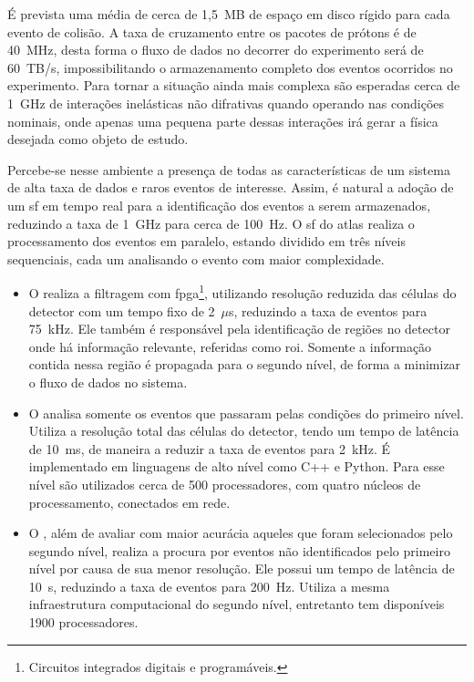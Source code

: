 É prevista uma média de cerca de 1,5~MB de espaço em disco rígido para cada evento de 
colisão. A taxa de cruzamento entre os pacotes de prótons é de 40~MHz, 
desta forma o fluxo de dados no decorrer do experimento será de 60~TB/s, impossibilitando o
armazenamento completo dos eventos ocorridos no experimento. Para tornar a
situação ainda mais complexa são esperadas cerca de 1~GHz de interações
inelásticas não difrativas quando operando nas condições nominais, onde apenas
uma pequena parte dessas interações irá gerar a física desejada como objeto de
estudo.

Percebe-se nesse ambiente a presença de todas as características de um sistema de 
alta taxa de dados e raros eventos de interesse.
Assim, é natural a adoção de um \glsdesc{sf} em tempo real para a
identificação dos eventos a serem armazenados, reduzindo a taxa de 1~GHz
para cerca de 100~Hz. O \glsdesc{sf} do \gls{atlas} realiza o processamento dos 
eventos em paralelo, estando dividido em três níveis sequenciais, cada um 
analisando o evento com maior complexidade.

\begin{itemize}
\item O  realiza a filtragem com
\gls{fpga}\footnote{Circuitos integrados digitais e programáveis.}, 
utilizando resolução reduzida das células do detector
com um tempo fixo de 2~$\mu$s, reduzindo a taxa de eventos para
75~kHz. Ele também é responsável pela identificação de regiões no detector onde
há informação relevante, referidas como \gls{roi}. Somente a
informação contida nessa região é propagada para o segundo nível, de forma a
minimizar o fluxo de dados no sistema.
\item O  analisa somente os eventos que passaram pelas condições do
primeiro nível. Utiliza a resolução total das células do detector, 
tendo um tempo de latência de 10~ms, de maneira a reduzir a taxa de eventos para
2~kHz. É implementado em linguagens de alto nível como C++ e Python. 
Para esse nível são utilizados cerca de 500 processadores, com quatro
núcleos de processamento, conectados em rede.
\item O , além de avaliar com maior acurácia aqueles que foram
selecionados pelo segundo nível, realiza a procura por eventos não identificados pelo
primeiro nível por causa de sua menor resolução. Ele possui um tempo de 
latência de 10~s, reduzindo a taxa de eventos para 200~Hz. Utiliza a mesma
infraestrutura computacional do segundo nível, entretanto tem disponíveis 1900
processadores.
\end{itemize}

